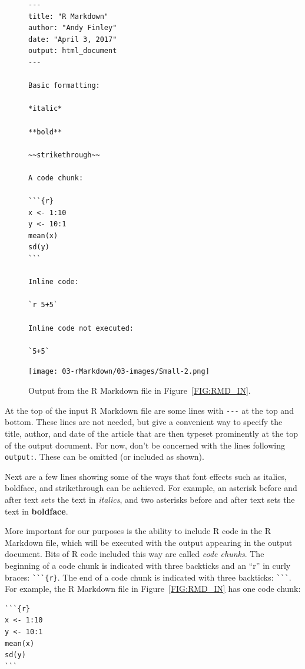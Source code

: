 \documentclass[12pt,oneside]{book}\usepackage[]{graphicx}\usepackage[]{color}
\begin{document}
\begin{figure}[!ht]
\centering
\begin{minipage}{0.45\textwidth}
\centering
\begin{verbatim}
---
title: "R Markdown"
author: "Andy Finley"
date: "April 3, 2017"
output: html_document
---

Basic formatting: 

*italic* 

**bold**

~~strikethrough~~ 

A code chunk:

```{r}
x <- 1:10
y <- 10:1
mean(x)
sd(y)
```

Inline code:

`r 5+5`

Inline code not executed:

`5+5`
\end{verbatim}
\caption{R Markdown file which produces the output in Figure~\ref{FIG:RMD_OUT}.}
\label{FIG:RMD_IN}
\end{minipage}\hfill
\begin{minipage}{0.45\textwidth}
\centering
\texttt{[image: 03-rMarkdown/03-images/Small-2.png]}%
\caption{Output from the R Markdown file in Figure~\ref{FIG:RMD_IN}.}
\label{FIG:RMD_OUT}
\end{minipage}
\end{figure}

At the top of the input R Markdown file are some lines with \verb+---+ at the top and bottom. These lines are not needed, but give a convenient way to specify the title, author, and date of the article that are then typeset prominently at the top of the output document. For now, don't be concerned with the lines following \verb+output:+. These can be omitted (or included as shown).

Next are a few lines showing some of the ways that font effects such as italics, boldface, and strikethrough can be achieved. For example, an asterisk before and after text sets the text in {\itshape italics}, and two asterisks before and after text sets the text in {\bfseries boldface}. 

More important for our purposes is the ability to include R code in the R Markdown file, which will be executed with the output appearing in the output document. Bits of R code included this way are called \emph{code chunks}. The beginning of a code chunk is indicated with three backticks and an ``r'' in curly braces: \verb+```{r}+. The end of a code chunk is indicated with three backticks: \verb+```+. For example, the R Markdown file in Figure~\ref{FIG:RMD_IN} has one code chunk:
\begin{verbatim}
```{r}
x <- 1:10
y <- 10:1
mean(x)
sd(y)
```
\end{verbatim}
\end{document}
